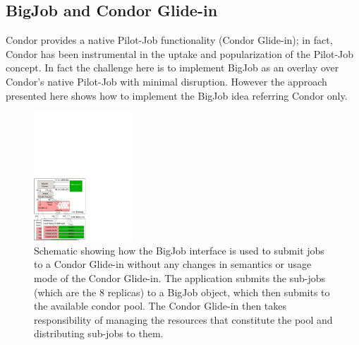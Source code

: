 \documentclass[conference,final]{IEEEtran}
\newcommand{\up}{\vspace*{-1em}}
\newcommand{\alnote}[1]{ {\textcolor{blue} { ***AL: #1 }}}
\newcommand{\jhanote}[1]{ {\textcolor{red} { ***SJ: #1 }}}
\newcommand{\alnote}[1]{}
\newcommand{\jhanote}[1]{}
\begin{document}


\subsection{BigJob and Condor Glide-in} 
\up


Condor provides a native Pilot-Job functionality (Condor Glide-in); in
fact, Condor has been instrumental in the uptake and popularization of
the Pilot-Job concept.  In fact the challenge here is to implement
BigJob as an overlay over Condor's native Pilot-Job with minimal
disruption. However the approach presented here shows how to
implement the BigJob idea referring Condor only.

\begin{figure}[!ht]
 \begin{center}
     \includegraphics[width=0.33\textwidth]{figures/bigjob_condor}
 \end{center}
 \caption{\small Schematic showing how the BigJob interface is used to
   submit jobs to a Condor Glide-in without any changes in semantics
   or usage mode of the Condor Glide-in. The application submits the
   sub-jobs (which are the 8 replicas) to a BigJob object, which then
   submits to the available condor pool. The Condor Glide-in then
   takes responsibility of managing the resources that constitute the
   pool and distributing sub-jobs to them.} \label{fig:saga-condor}
\end{figure}
\end{document}

